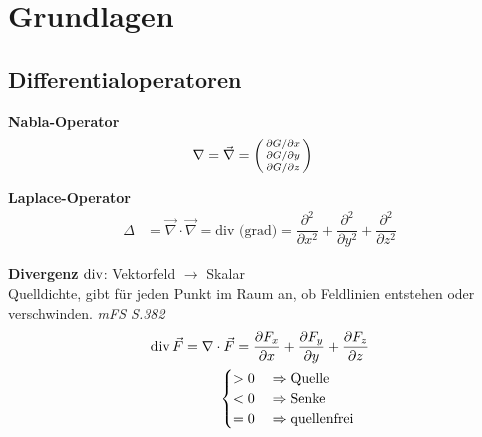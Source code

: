 \section{Grundlagen}
\subsection{Differentialoperatoren}

\textbf{Nabla-Operator}
\begin{align*}
    \nabla & = \vec{\nabla} = 
    \begin{psmallmatrix}
        \partial G / \partial x \\
        \partial G / \partial y \\
        \partial G / \partial z
    \end{psmallmatrix}
\end{align*}

\textbf{Laplace-Operator}
\begin{align*}
    \varDelta  & = \vec{\nabla} \cdot \vec{\nabla} = \textrm{div (grad)} = 
    \dfrac{\partial ^2}{\partial x^2}+\dfrac{\partial ^2}{\partial y^2}+\dfrac{\partial ^2}{\partial z^2}
\end{align*}

\textbf{Divergenz} $\operatorname{div}$: Vektorfeld $\rightarrow$ Skalar\\
\small{Quelldichte, gibt für jeden Punkt im Raum an, ob Feldlinien entstehen oder verschwinden. \textit{mFS S.382}}
\begin{align*}
    \operatorname{div} \vec{F} = \nabla \cdot \vec{F}   =  \dfrac{\partial F_x}{\partial x} 
    + \dfrac{\partial F_y}{\partial y} + \dfrac{\partial F_z}{\partial z}\\ 
                                 \begin{cases}
    > 0 \quad\Rightarrow \textnormal{Quelle}  \\
    < 0 \quad\Rightarrow \textnormal{Senke} \\
    = 0 \quad\Rightarrow \textnormal{quellenfrei} 
\end{cases}                                      
\end{align*}\\

